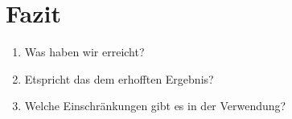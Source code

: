 \section{Fazit}
\begin{enumerate}
    \item Was haben wir erreicht?
    \item Etspricht das dem erhofften Ergebnis?
    \item Welche Einschränkungen gibt es in der Verwendung?
\end{enumerate}

\newpage
